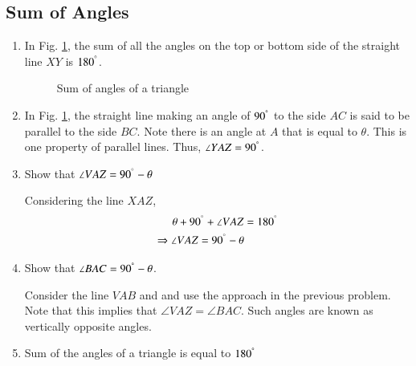 \subsection{Sum of Angles}
\renewcommand{\theequation}{\theenumi}
\begin{enumerate}[label=\arabic*.,ref=\thesubsection.\theenumi]
\item 	In Fig. \ref{ch1_parallel_triangle}, the sum of all the angles on the top or bottom side of the straight line $XY$ is $180^{\degree}$.


\begin{figure}[!ht]
	\begin{center}
		\resizebox{\columnwidth}{!}{}
	\end{center}
	\caption{Sum of angles of a triangle}
	\label{ch1_parallel_triangle}	
\end{figure}



\item
In Fig. \ref{ch1_parallel_triangle}, the straight line making an angle of $90^{\degree}$ to the side $AC$ is said to be parallel to the side $BC$. Note there is an angle at $A$ that is equal to $\theta$.  This is one property of parallel lines.  Thus, $\angle YAZ = 90^{\degree}$.


\item
	Show that $\angle VAZ = 90^{\degree} - \theta$
		
	\proof Considering the line $XAZ$,
	\begin{align}
	\theta + 90^{\degree} + \angle VAZ &= 180^{\degree} \\
	\Rightarrow  \angle VAZ =  90^{\degree} - \theta
	\end{align}

\item
	\label{ch1_compl_angle}
	Show that $\angle BAC = 90^{\degree} - \theta$.
	
	\proof Consider the line $VAB$ and and use the approach in the previous problem.  Note that this implies that $\angle VAZ = \angle BAC$.  Such angles are known as vertically opposite angles. 
	 
\item
Sum of the angles of a triangle is equal to $180^{\degree}$
\end{enumerate}
